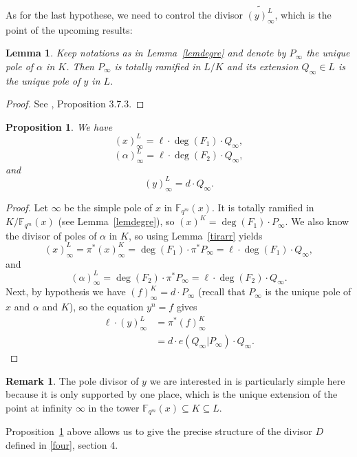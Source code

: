 \documentclass[10pt]{article}
\newtheorem{prop1}[thm]{Proposition}
\newtheorem{lem1}[thm]{Lemma}
\theoremstyle{definition}
\newtheorem{rq1}[thm]{Remark}
\theoremstyle{definition}
\theoremstyle{definition}
\newcommand{\cd}{\cdot}
\newcommand{\fqm}{\mathbb{F}_{q^m}}
\newcommand{\su}{\subseteq}
\begin{document}
As for the last hypothese, we need to control the divisor $\widetilde{(y)^L_{\infty}}$, which is the point of the upcoming results: 

\begin{lem1} \label{ramification}
Keep notations as in Lemma~\ref{lemdegre} and denote by $P_{\infty}$ the unique pole of $\alpha$ in $K$. Then $P_{\infty}$ is totally ramified in $L/K$ and its extension $Q_{\infty} \in L$ is the unique pole of $y$ in $L$. 
\end{lem1}

\begin{proof}
See \cite{Sti}, Proposition 3.7.3.
\end{proof}

\begin{prop1} \label{propcle}
We have
\[(x)^L_{\infty} = \ell \cd \deg(F_1) \cd Q_{\infty},\]
\[(\alpha)^L_{\infty} = \ell \cd \deg(F_2) \cd Q_{\infty},\]
and
\[(y)^L_{\infty} = d \cd Q_{\infty}.\]
\end{prop1}

\begin{proof}
Let $\infty$ be the simple pole of $x$ in $\fqm(x)$. It is totally ramified in $K/\fqm(x)$ (see Lemma~\ref{lemdegre}), so $(x)^K = \deg(F_1) \cd P_{\infty}$. We also know the divisor of poles of $\alpha$ in $K$, so using Lemma~\ref{tirarr} yields
\[(x)^L_{\infty} = \pi^*(x)^K_{\infty} = \deg(F_1) \cd \pi^*P_{\infty} = \ell \cd \deg(F_1) \cd Q_{\infty},\]
and
\[(\alpha)^L_{\infty} = \deg(F_2) \cd \pi^*P_{\infty} = \ell \cd \deg(F_2) \cd Q_{\infty}.\]
Next, by hypothesis we have $(f)^K_{\infty} = d \cd P_{\infty}$ (recall that $P_{\infty}$ is the unique pole of $x$ and $\alpha$ and $K$), so the equation $y^n=f$ gives
\begin{align*} \ell \cd (y)^L_{\infty} &= \pi^*(f)^K_{\infty} \\
&= d \cd e(Q_{\infty}|P_{\infty}) \cd Q_{\infty}.
\end{align*}
\end{proof}

\begin{rq1} The pole divisor of $y$ we are interested in is particularly simple here because it is only supported by one place, which is the unique extension of the point at infinity $\infty$ in the tower $\fqm(x) \su K \su L$.
\end{rq1}

Proposition~\ref{propcle} above allows us to give the precise structure of the divisor $D$ defined in \eqref{four}, section 4.
\end{document}
